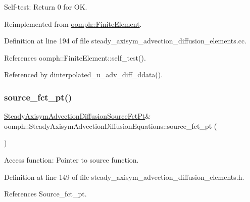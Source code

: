 Self-\/test\+: Return 0 for OK. 



Reimplemented from \hyperlink{classoomph_1_1FiniteElement_af94c5a5e22175d5420b33b3b79e46ed3}{oomph\+::\+Finite\+Element}.



Definition at line 194 of file steady\+\_\+axisym\+\_\+advection\+\_\+diffusion\+\_\+elements.\+cc.



References oomph\+::\+Finite\+Element\+::self\+\_\+test().



Referenced by dinterpolated\+\_\+u\+\_\+adv\+\_\+diff\+\_\+ddata().

\mbox{\label{classoomph_1_1SteadyAxisymAdvectionDiffusionEquations_a26824483f165925c3879548846400a9e}} 
\subsubsection{\texorpdfstring{source\+\_\+fct\+\_\+pt()}{source\_fct\_pt()}\hspace{0.1cm}{\footnotesize\ttfamily [1/2]}}
{\footnotesize\ttfamily \hyperlink{classoomph_1_1SteadyAxisymAdvectionDiffusionEquations_a1a8121ed2ce92dc69aa85c71975489d0}{Steady\+Axisym\+Advection\+Diffusion\+Source\+Fct\+Pt}\& oomph\+::\+Steady\+Axisym\+Advection\+Diffusion\+Equations\+::source\+\_\+fct\+\_\+pt (\begin{DoxyParamCaption}{ }\end{DoxyParamCaption})\hspace{0.3cm}{\ttfamily [inline]}}



Access function\+: Pointer to source function. 



Definition at line 149 of file steady\+\_\+axisym\+\_\+advection\+\_\+diffusion\+\_\+elements.\+h.



References Source\+\_\+fct\+\_\+pt.

\mbox{\label{classoomph_1_1SteadyAxisymAdvectionDiffusionEquations_a0d539f7d7024cdefd9ec14be1c3d3ce1}} 
